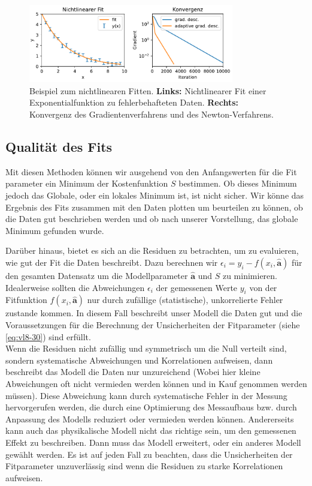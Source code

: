 \begin{figure}[tbp]
    \centering
        \includegraphics[width=0.8\textwidth]{Figures/nonlinear_fitting_image.pdf}
        \caption{Beispiel zum nichtlinearen Fitten. \textbf{Links:} Nichtlinearer Fit einer Exponentialfunktion zu fehlerbehafteten Daten. \textbf{Rechts:} Konvergenz des Gradientenverfahrens und des Newton-Verfahrens.  }
        \label{fig:nonlinearFit}
\end{figure} 

\subsection{Qualität des Fits}
\label{subsec:vl9-3}

Mit diesen Methoden können wir ausgehend von den Anfangswerten für die Fit parameter ein Minimum der Kostenfunktion $S$ bestimmen. Ob dieses Minimum jedoch das Globale, oder ein lokales Minimum ist, ist nicht sicher. Wir könne das Ergebnis des Fits zusammen mit den Daten plotten um beurteilen zu können, ob die Daten gut beschrieben werden und ob nach unserer Vorstellung, das globale Minimum gefunden wurde.

Darüber hinaus, bietet es sich an die Residuen zu betrachten, um zu evaluieren, wie gut der Fit die Daten beschreibt. Dazu berechnen wir $\epsilon_i =y_i - f(x_i, \boldsymbol{\hat{a}})$ für den gesamten Datensatz um die Modellparameter $\boldsymbol{\hat{a}}$ und $S$ zu minimieren. Idealerweise sollten die Abweichungen $\epsilon_i$ der gemessenen Werte $y_i$ von der Fitfunktion $f(x_i, \boldsymbol{\hat{a}})$ nur durch zufällige (statistische), unkorrelierte Fehler zustande kommen. In diesem Fall beschreibt unser Modell die Daten gut und die Voraussetzungen für die Berechnung der Unsicherheiten der Fitparameter (siehe \cref{eq:vl8-30}) sind erfüllt.\\
Wenn die Residuen nicht zufällig und symmetrisch um die Null verteilt sind, sondern systematische Abweichungen und Korrelationen aufweisen, dann beschreibt das Modell die Daten nur unzureichend (Wobei hier kleine Abweichungen oft nicht vermieden werden können und in Kauf genommen werden müssen). Diese Abweichung kann durch systematische Fehler in der Messung hervorgerufen werden, die durch eine Optimierung des Messaufbaus bzw. durch Anpassung des Modells reduziert oder vermieden werden können. Andererseits kann auch das physikalische Modell nicht das richtige sein, um den gemessenen Effekt zu beschreiben. Dann muss das Modell erweitert, oder ein anderes Modell gewählt werden. Es ist auf jeden Fall zu beachten, dass die Unsicherheiten der Fitparameter unzuverlässig sind wenn die Residuen zu starke Korrelationen aufweisen.


